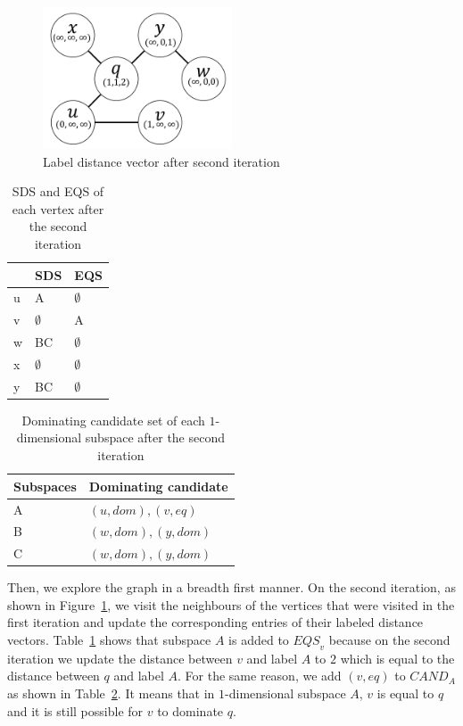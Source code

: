 \begin{figure}[H]
    \centering
    \includegraphics[width=0.5\textwidth]{figs/graph_example_2}
    \caption{Label distance vector after second iteration}
    \label{fig:cand_step2}
\end{figure}

\begin{table}[H]
    \centering
    \begin{tabular}{|l|l|l|}
    \hline
      & SDS         & EQS         \\ \hline
    u & A           & $\emptyset$ \\ \hline
    v & $\emptyset$ & A           \\ \hline
    w & BC          & $\emptyset$ \\ \hline
    x & $\emptyset$ & $\emptyset$ \\ \hline
    y & BC          & $\emptyset$ \\ \hline
    \end{tabular}
    \caption{SDS and EQS of each vertex after the second iteration}
    \label{tab:sds_step2}
\end{table}

\begin{table}[H]
    \centering

    \begin{tabular}{|l|l|}
    \hline
    Subspaces & Dominating candidate \\ \hline
    A         & $(u, dom), (v, eq)$            \\ \hline
    B         & $(w, dom), (y, dom)$            \\ \hline
    C         & $(w, dom), (y, dom)$            \\ \hline
    \end{tabular}
    \caption{Dominating candidate set of each $1$-dimensional subspace after the second iteration}
    \label{tab:cand_set_step2}
\end{table}


Then, we explore the graph in a breadth first manner. On the second iteration, as shown in Figure~\ref{fig:cand_step2}, we visit the neighbours of the vertices that were visited in the first iteration and update the corresponding entries of their labeled distance vectors. Table~\ref{tab:sds_step2} shows that subspace $A$ is added to $\mathit{EQS}_v$ because on the second iteration we update the distance between $v$ and label $A$ to $2$ which is equal to the distance between $q$ and label $A$. For the same reason, we add $(v, eq)$ to $\mathit{CAND}_A$ as shown in Table~\ref{tab:cand_set_step2}. It means that in $1$-dimensional subspace $A$, $v$ is equal to $q$ and it is still possible for $v$ to dominate $q$.

